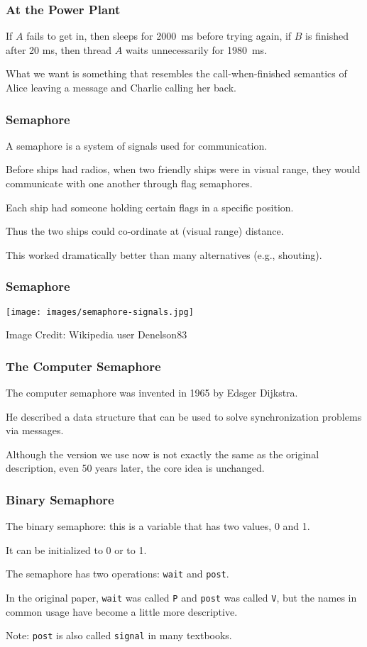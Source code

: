 \begin{frame}
	\frametitle{At the Power Plant}

	If $A$ fails to get in, then sleeps for 2000~ms before trying again, if $B$ is finished after 20 ms, then thread $A$ waits unnecessarily for 1980~ms.

	What we want is something that resembles the call-when-finished semantics of Alice leaving a message and Charlie calling her back.

\end{frame}

\begin{frame}
	\frametitle{Semaphore}

	A semaphore is a system of signals used for communication.

	Before ships had radios, when two friendly ships were in visual range, they would communicate with one another through flag semaphores.

	Each ship had someone holding certain flags in a specific position.

	Thus the two ships could co-ordinate at (visual range) distance.

	This worked dramatically better than many alternatives (e.g., shouting).

\end{frame}


\begin{frame}
	\frametitle{Semaphore}

	\begin{center}
		\texttt{[image: images/semaphore-signals.jpg]}
	\end{center}
	\hfill Image Credit: Wikipedia user Denelson83

\end{frame}


\begin{frame}
	\frametitle{The Computer Semaphore}

	The computer semaphore was invented in 1965 by Edsger Dijkstra.

	He described a data structure that can be used to solve synchronization problems via messages.

	Although the version we use now is not exactly the same as the original description, even 50 years later, the core idea is unchanged.


\end{frame}

\begin{frame}
	\frametitle{Binary Semaphore}

	The \alert{binary semaphore}: this is a variable that has two values, 0 and 1.

	It can be initialized to 0 or to 1.

	The semaphore has two operations: \texttt{wait} and \texttt{post}.

	In the original paper, \texttt{wait} was called \texttt{P} and \texttt{post} was called \texttt{V}, but the names in common usage have become a little more descriptive.

	Note: \texttt{post} is also called \texttt{signal} in many textbooks.


\end{frame}

